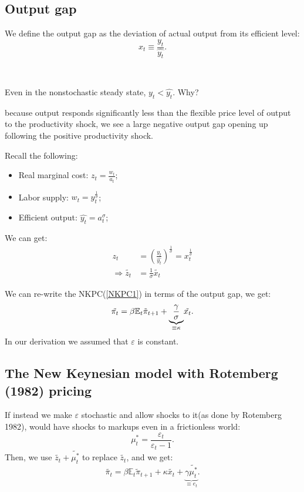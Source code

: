 \subsection{Output gap}
We define the output gap as the deviation of actual output from its efficient level:
\[x_t \equiv \frac{y_t}{\hat{y_t}}.\]

\begin{remark}
    \ 

    Even in the nonstochastic steady state, $y_t < \hat{y_t}$. Why?

    because output responds significantly less than the flexible price level of output to the productivity shock, 
    we see a large negative output gap opening up following the positive productivity shock.
\end{remark}

Recall the following:
\begin{itemize}
    \item Real marginal cost: $z_t = \frac{w_t}{a_t}$;
    \item Labor supply: $w_t = y_t^{\frac{1}{\sigma}}$;
    \item Efficient output: $\hat{y_t} = a_t^{\sigma}$;
\end{itemize}
We can get:
\begin{align*}
    z_t &= \left(\frac{y_t}{\hat{y_t}}\right)^{\frac{1}{\sigma}} = x_t^{\frac{1}{\sigma}} \\
    \Rightarrow \tilde{z_t} &= \frac{1}{\sigma} \tilde{x_t}
\end{align*}

We can re-write the NKPC(\ref{NKPC1}) in terms of the output gap, we get:
\[\tilde{\pi _t} = \beta \mathbb{E}_t \tilde{\pi}_{t+1} + \underset{\equiv \kappa}{\underbrace{\frac{\gamma}{\sigma}}} \tilde{x_t} \protect\label{NKPC2}.\]
In our derivation we assumed that $\varepsilon$ is constant.

\subsection{The New Keynesian model with Rotemberg (1982) pricing}
If instead we make $\varepsilon$ stochastic and allow shocks to it(as done by Rotemberg 1982),
would have shocks to markups even in a frictionless world:
\[\mu_t^* = \frac{\varepsilon_t}{\varepsilon_t - 1}.\]
Then, we use $\tilde{z_t} + \tilde{\mu_t^*}$ to replace $\tilde{z_t}$, and we get:
\begin{equation}\label{NKPC}
    \tilde{\pi _t} = \beta \mathbb{E}_t \tilde{\pi}_{t+1} + \kappa \tilde{x_t} + \underset{\equiv e_t}{\underbrace{\gamma \tilde{\mu_t^*}}}.
\end{equation}

